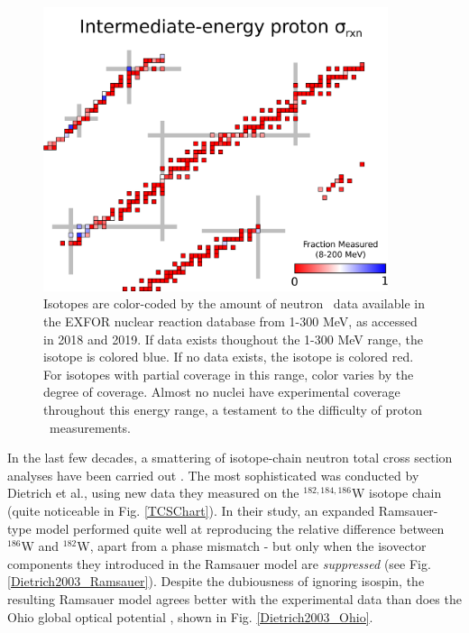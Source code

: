 \begin{figure}
    \centering
    \includegraphics[width=0.9\textwidth]{figures/RCSChart.png}
    \caption[Landscape of existing proton \rxn\ data in 2019]
    {Isotopes are color-coded by the amount of neutron \tot\ data available in the EXFOR nuclear
        reaction database from 1-300 MeV, as accessed in 2018 and 2019. If data exists thoughout the 1-300 MeV range, the isotope
        is colored blue. If no data exists, the isotope is colored red. For
        isotopes with partial coverage in this range, color varies by the degree
        of coverage. Almost no nuclei have experimental coverage throughout this energy
        range, a testament to the difficulty of proton \rxn\ measurements.}
    \label{RCSChart}
\end{figure}

In the last few decades, a smattering of isotope-chain neutron total cross section
analyses have been carried out \cite{Mukhopadhyay2011, Anderson1990, Camarda1984}. The most sophisticated
was conducted by Dietrich et al.\cite{Dietrich2003},
using new data they measured on the $^{182,184,186}$W isotope chain (quite noticeable in Fig.
\ref{TCSChart}). In their study, an expanded Ramsauer-type model performed quite well at reproducing the relative 
difference between $^{186}$W and $^{182}$W, apart from a
phase mismatch - but only when the isovector components they introduced in the
Ramsauer model are \textit{suppressed} (see Fig. \ref{Dietrich2003_Ramsauer}). Despite the
dubiousness of ignoring isospin, the resulting Ramsauer model
agrees better with the experimental data than does the Ohio global optical 
potential \cite{Rapaport1979}, shown in Fig. \ref{Dietrich2003_Ohio}.

